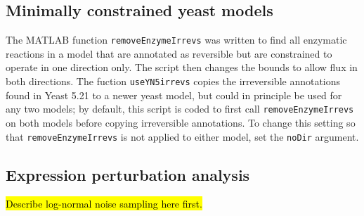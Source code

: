 \subsection{Minimally constrained yeast models}
The MATLAB function \texttt{removeEnzymeIrrevs} was written to find
all enzymatic reactions in a model that are annotated as reversible
but are constrained to operate in one direction only. The script then
changes the bounds to allow flux in both directions. The fuction
\texttt{useYN5irrevs} copies the irreversible annotations found in
Yeast 5.21 \citep{Lee2012} to a newer yeast model, but could in
principle be used for any two models; by default, this script is coded
to first call \texttt{removeEnzymeIrrevs} on both models before
copying irreversible annotations. To change this setting so that
\texttt{removeEnzymeIrrevs} is not applied to either model, set the
\texttt{noDir} argument.

\subsection{Expression perturbation analysis}
\label{sec:noise}
\hl{Describe log-normal noise sampling here first.}

